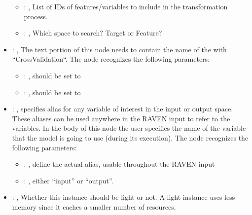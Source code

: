 \begin{itemize}
\begin{itemize}
        \item {}: ,
          List of IDs of features/variables to include in the transformation process.

        \item {}: ,
          Which space to search? Target or Feature?
      \end{itemize}

    \item {}: ,
      The text portion of this node needs to contain the name of the  with
               ``CrossValidation``.
      The  node recognizes the following parameters:
        \begin{itemize}
          \item {}: ,
            should be set to 
          \item {}: ,
            should be set to 
      \end{itemize}

    \item {}: ,
      specifies alias for         any variable of interest in the input or output space. These
      aliases can be used anywhere in the RAVEN input to         refer to the variables. In the body
      of this node the user specifies the name of the variable that the model is going to use
      (during its execution).
      The  node recognizes the following parameters:
        \begin{itemize}
          \item {}: ,
            define the actual alias, usable throughout the RAVEN input
          \item {}: ,
            either ``input'' or ``output''.
      \end{itemize}

    \item {}: ,
      Whether this instance should be light or not. A light instance uses
      less memory since it caches a smaller number of resources.


\end{itemize}
